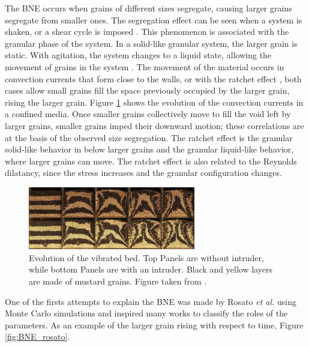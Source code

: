     The BNE occurs when grains of different sizes segregate, causing larger grains segregate from smaller ones. The segregation effect can be seen when a system is shaken, or a shear cycle is imposed \cite{Granular_Physics}. This phenomenon is associated with the granular phase of the system. In a solid-like granular system, the larger grain is static. With agitation, the system changes to a liquid state, allowing the movement of grains in the system \cite{Why_the_Brazil_nuts_are_on_top}. The movement of the material occurs in convection currents that form close to the walls, or with the ratchet effect \cite{Effects_of_convection_and_friction_on_size_segregation_in_vibrated_granular_beds, Scaling_behavior_in_convection-driven_Brazil-nut_effect, Inertia_in_the_Brazil_nut_problem, The_water-enhance_Brazil_nut_effect}, both cases allow small grains fill the space previously occupied by the larger grain, rising the larger grain. Figure \ref{fig:BNE_hejmady_convection} shows the evolution of the convection currents in a confined media. Once smaller grains collectively move to fill the void left by larger grains, smaller grains imped their downward motion; these correlations are at the basis of the observed size segregation. The ratchet effect is the granular solid-like behavior in below larger grains and the granular liquid-like behavior, where larger grains can move. The ratchet effect is also related to the Reynolds dilatancy, since the stress increases and the granular configuration changes.

\begin{figure}
    \centering
    \includegraphics[width=0.65\textwidth]{04-figuras/BNE_Hejmady_Convection.png}
    \caption[Granular convection in vibrated bed.]{Evolution of the vibrated bed. Top Panels are without intruder, while bottom Panels are with an intruder. Black and yellow layers are made of mustard grains. Figure taken from \cite{Scaling_behavior_in_convection-driven_Brazil-nut_effect}.}
    \label{fig:BNE_hejmady_convection}
\end{figure}

    One of the firsts attempts to explain the BNE was made by Rosato \textit{et al.} \cite{Why_the_Brazil_nuts_are_on_top} using Monte Carlo simulations and inspired many works to classify the roles of the parameters. As an example of the larger grain rising with respect to time, Figure \ref{fig:BNE_rosato}.

